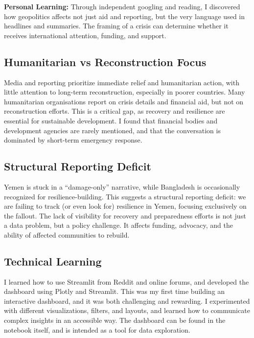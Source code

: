 \documentclass[12pt]{article}
\begin{document}
\textbf{Personal Learning:} Through independent googling and reading, I discovered how geopolitics affects not just aid and reporting, but the very language used in headlines and summaries. The framing of a crisis can determine whether it receives international attention, funding, and support.

\subsection{Humanitarian vs Reconstruction Focus}
Media and reporting prioritize immediate relief and humanitarian action, with little attention to long-term reconstruction, especially in poorer countries. Many humanitarian organisations report on crisis details and financial aid, but not on reconstruction efforts. This is a critical gap, as recovery and resilience are essential for sustainable development. I found that financial bodies and development agencies are rarely mentioned, and that the conversation is dominated by short-term emergency response.

\subsection{Structural Reporting Deficit}
Yemen is stuck in a “damage-only” narrative, while Bangladesh is occasionally recognized for resilience-building. This suggests a structural reporting deficit: we are failing to track (or even look for) resilience in Yemen, focusing exclusively on the fallout. The lack of visibility for recovery and preparedness efforts is not just a data problem, but a policy challenge. It affects funding, advocacy, and the ability of affected communities to rebuild.

\subsection{Technical Learning}
I learned how to use Streamlit from Reddit and online forums, and developed the dashboard using Plotly and Streamlit. This was my first time building an interactive dashboard, and it was both challenging and rewarding. I experimented with different visualizations, filters, and layouts, and learned how to communicate complex insights in an accessible way. The dashboard can be found in the notebook itself, and is intended as a tool for data exploration.
\end{document}

